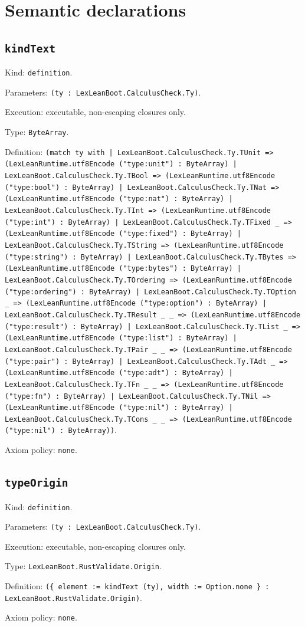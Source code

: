 \documentclass[11pt]{article}
\begin{document}
\section*{Semantic declarations}
\subsection*{\texttt{kindText}}
\noindent Kind: \texttt{definition}.\par
\noindent Parameters: \texttt{(ty : LexLeanBoot.CalculusCheck.Ty)}.\par
\noindent Execution: executable, non-escaping closures only.\par
\noindent Type: \texttt{ByteArray}.\par
\noindent Definition: \texttt{(match ty with | LexLeanBoot.CalculusCheck.Ty.TUnit => (LexLeanRuntime.utf8Encode ("type:unit") : ByteArray) | LexLeanBoot.CalculusCheck.Ty.TBool => (LexLeanRuntime.utf8Encode ("type:bool") : ByteArray) | LexLeanBoot.CalculusCheck.Ty.TNat => (LexLeanRuntime.utf8Encode ("type:nat") : ByteArray) | LexLeanBoot.CalculusCheck.Ty.TInt => (LexLeanRuntime.utf8Encode ("type:int") : ByteArray) | LexLeanBoot.CalculusCheck.Ty.TFixed \_ => (LexLeanRuntime.utf8Encode ("type:fixed") : ByteArray) | LexLeanBoot.CalculusCheck.Ty.TString => (LexLeanRuntime.utf8Encode ("type:string") : ByteArray) | LexLeanBoot.CalculusCheck.Ty.TBytes => (LexLeanRuntime.utf8Encode ("type:bytes") : ByteArray) | LexLeanBoot.CalculusCheck.Ty.TOrdering => (LexLeanRuntime.utf8Encode ("type:ordering") : ByteArray) | LexLeanBoot.CalculusCheck.Ty.TOption \_ => (LexLeanRuntime.utf8Encode ("type:option") : ByteArray) | LexLeanBoot.CalculusCheck.Ty.TResult \_ \_ => (LexLeanRuntime.utf8Encode ("type:result") : ByteArray) | LexLeanBoot.CalculusCheck.Ty.TList \_ => (LexLeanRuntime.utf8Encode ("type:list") : ByteArray) | LexLeanBoot.CalculusCheck.Ty.TPair \_ \_ => (LexLeanRuntime.utf8Encode ("type:pair") : ByteArray) | LexLeanBoot.CalculusCheck.Ty.TAdt \_ => (LexLeanRuntime.utf8Encode ("type:adt") : ByteArray) | LexLeanBoot.CalculusCheck.Ty.TFn \_ \_ => (LexLeanRuntime.utf8Encode ("type:fn") : ByteArray) | LexLeanBoot.CalculusCheck.Ty.TNil => (LexLeanRuntime.utf8Encode ("type:nil") : ByteArray) | LexLeanBoot.CalculusCheck.Ty.TCons \_ \_ => (LexLeanRuntime.utf8Encode ("type:nil") : ByteArray))}.\par
\noindent Axiom policy: \texttt{none}.\par
\subsection*{\texttt{typeOrigin}}
\noindent Kind: \texttt{definition}.\par
\noindent Parameters: \texttt{(ty : LexLeanBoot.CalculusCheck.Ty)}.\par
\noindent Execution: executable, non-escaping closures only.\par
\noindent Type: \texttt{LexLeanBoot.RustValidate.Origin}.\par
\noindent Definition: \texttt{(\{ element := kindText (ty), width := Option.none \} : LexLeanBoot.RustValidate.Origin)}.\par
\noindent Axiom policy: \texttt{none}.\par
\end{document}
